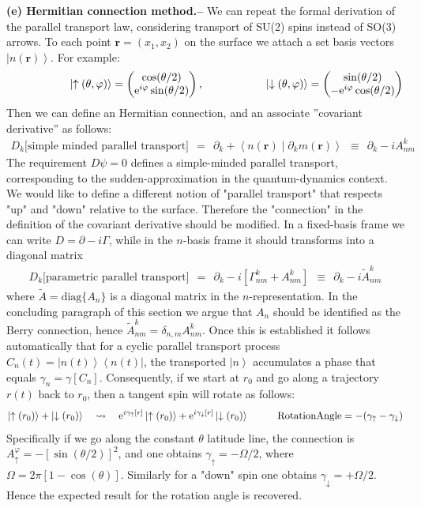 \documentclass[onecolumn,fleqn, 11pt]{revtex4}
\newcommand{\eexp}{\mathrm{e}^}
\newcommand{\amatrix}[1]{\begin{matrix} #1 \end{matrix}}
\newcommand{\bra}[1]{\left\langle #1 \right|}
\newcommand{\ket}[1]{\left| #1 \right\rangle}
\newcommand{\Braket}[2]{\left\langle #1 \middle| #2 \right\rangle}
\newcommand{\beq}{\begin{eqnarray}}
\newcommand{\eeq}{\end{eqnarray}}
\begin{document}
{\bf (e) Hermitian connection method.-- } 
We can repeat the formal derivation of the parallel transport law, considering transport of  SU(2) spins instead of SO(3) arrows.
To each point ${\bm{r}=(x_1,x_2)}$ on the surface we attach a set basis vectors $\ket{n(\bm{r})}$. 
For example:    
\beq
\hspace*{2cm}
\ket{\uparrow(\theta,\varphi)} = \left(\amatrix{\cos(\theta/2) \\ \eexp{i\varphi}\sin(\theta/2)}\right),
\hspace*{2cm}
\ket{\downarrow(\theta,\varphi)} = \left(\amatrix{\sin(\theta/2) \\ -\eexp{i\varphi}\cos(\theta/2)}\right)
\eeq
Then we can define an Hermitian connection, and an associate ”covariant derivative” as follows: 
\beq
D_k\text{[simple minded parallel transport]} 
\ \ = \ \ \partial_k + \Braket{n(\bm{r})}{\partial_k m(\bm{r})} 
\ \ \equiv \ \ \partial_k -iA_{nm}^k  
\eeq
The requirement $D\psi=0$ defines a simple-minded parallel transport, 
corresponding to the sudden-approximation in the quantum-dynamics context. 
We would like to define a different notion of "parallel transport" 
that respects "up" and "down" relative to the surface. 
Therefore the "connection" in the definition of the covariant derivative
should be modified. In a fixed-basis frame we can write ${D=\partial-i\Gamma}$, 
while in the $n$-basis frame it should transforms into a diagonal matrix 
\beq
D_k\text{[parametric parallel transport]} 
\ \ = \ \ \partial_k -i \left[\Gamma_{nm}^{k}+A^k_{nm}\right] 
\ \ \equiv \ \  \partial_k - i\tilde{A}_{nm}^k
\eeq
where $\tilde{A}=\text{diag}\{A_n\}$ is a diagonal matrix in the $n$-representation.
In the concluding paragraph of this section we argue 
that $A_n$ should be identified as the Berry connection, 
hence ${\tilde{A}_{nm}^k=\delta_{n,m}A^k_{nm}}$.   
Once this is established it follows automatically that 
for a cyclic parallel transport process ${C_n(t)=\ket{n(t)}\!\bra{n(t)}}$, 
the transported $\ket{n}$ accumulates a phase that equals ${\gamma_n=\gamma[C_n]}$.  
Consequently, if we start at ${r_0}$ and go along a trajectory $r(t)$ back to ${r_0}$, 
then a tangent spin will rotate as follows:
\beq
\ket{\uparrow(r_0)}+\ket{\downarrow(r_0)} 
\ \ \  \leadsto \ \ \ 
\eexp{i\gamma_{\uparrow}[r]}\ket{\uparrow(r_0)}+\eexp{i\gamma_{\downarrow}[r]}\ket{\downarrow(r_0)}
\hspace*{1cm}
\text{RotationAngle} = - (\gamma_{\uparrow}-\gamma_{\downarrow}) 
\eeq
Specifically if we go along the constant $\theta$ latitude line, 
the connection is ${A_{\uparrow}^{\varphi}=-[\sin(\theta/2)]^2}$, 
and one obtains ${\gamma_{\uparrow}=-\Omega/2}$, where ${\Omega=2\pi[1{-}\cos(\theta)]}$.   
Similarly for a "down" spin  one obtains ${\gamma_{\downarrow}=+\Omega/2}$. 
Hence the expected result for the rotation angle is recovered. 
\end{document}
